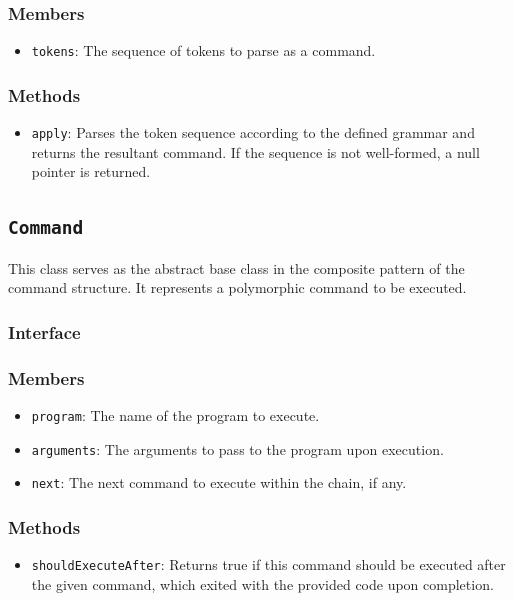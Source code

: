 \documentclass{article}
\begin{document}
  \subsubsection{Members}
  \begin{itemize}
    \item \texttt{tokens}: The sequence of tokens to parse as a command.
  \end{itemize}

  \subsubsection{Methods}
  \begin{itemize}
    \item \texttt{apply}: Parses the token sequence according to the
      defined grammar and returns the resultant command.  If the
      sequence is not well-formed, a null pointer is returned.
  \end{itemize}

  \subsection{\texttt{Command}}

  This class serves as the abstract base class in the composite pattern
  of the command structure.  It represents a polymorphic command to be
  executed.

  \subsubsection{Interface}
  

  \subsubsection{Members}
  \begin{itemize}
    \item \texttt{program}: The name of the program to execute.
    \item \texttt{arguments}: The arguments to pass to the program upon
      execution.
    \item \texttt{next}: The next command to execute within the chain,
      if any.
  \end{itemize}

  \subsubsection{Methods}
  \begin{itemize}
    \item \texttt{shouldExecuteAfter}: Returns true if this command
      should be executed after the given command, which exited with the
      provided code upon completion.
  \end{itemize}
\end{document}
